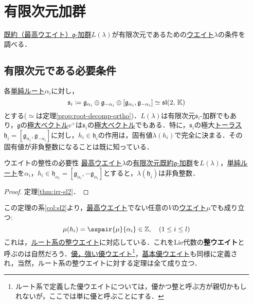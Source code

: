 \documentclass[rep_main]{subfiles}
\begin{document}
\section{有限次元加群}
\hyperref[thm:hwmodule-exist]{既約（最高ウエイト）$\mathfrak{g}$-加群}$L(\lambda)$が有限次元であるための\hyperref[def:weight-rep]{ウエイト}$\lambda$の条件を調べる．
\subsection{有限次元である必要条件}
各\hyperref[def:base-root]{単純ルート}$\alpha_i$に対し，
	\begin{equation}
		\mathfrak{s}_i \coloneqq \mathfrak{g}_{\alpha_i} \oplus \mathfrak{g}_{-\alpha_i} \oplus [\mathfrak{g}_{\alpha_i}, \mathfrak{g}_{-\alpha_i}] \simeq \mathfrak{sl}(2,\, \mathbb{K})
	\end{equation}
	とする($\simeq$は定理\ref{prop:root-decomp-ortho})．$L(\lambda)$は有限次元$\mathfrak{s}_i$-加群でもあり，$\mathfrak{g}$の\hyperref[def:maximal-vector-rep]{極大ベクトル}$v^+$は$\mathfrak{s}_i$の\hyperref[def:maximal-vector-rep]{極大ベクトル}でもある．特に，$\mathfrak{s}_i$の極大\hyperref[def:toral-subLieAlg]{トーラス}$\mathfrak{h}_i = [\mathfrak{g}_{\alpha_i}, \mathfrak{g}_{-\alpha_i}]$に対し，$h_i \in \mathfrak{h}_i$の作用は，固有値$\lambda(h_i)$で完全に決まる．その固有値が非負整数になることは既に知っている．
\begin{mytheo}[label=thm:necessary-for-finite]{ウエイトの整性の必要性}
	\hyperref[def:highest-weight-module]{最高ウエイト}$\lambda$の\hyperref[thm:hwmodule-exist]{有限次元既約$\mathfrak{g}$-加群}を$L(\lambda)$，\hyperref[def:base-root]{単純ルート}を$\alpha_i$，$h_i \in \mathfrak{h}_{\alpha_i} = [\mathfrak{g}_{\alpha_i}, -\mathfrak{g}_{\alpha_i}]$とすると，$\lambda(\mathfrak{h}_i)$は非負整数．
\end{mytheo}
\begin{proof}
	定理\ref{thm:irr-sl2}．
\end{proof}
この定理の系\ref{col:sl2}より，\hyperref[def:highest-weight-module]{最高ウエイト}でない任意の$V$の\hyperref[def:weight-rep]{ウエイト}$\mu$でも成り立つ:
\begin{equation}
	\label{eq:int-weight}
	\mu(h_i) = \sspair{\mu}{\alpha_i} \in \mathbb{Z},\quad  (1 \leq i \leq l)
\end{equation}
これは，\hyperref[def:root-lattice]{ルート系の整ウエイト}に対応している．これをLie代数の\textbf{整ウエイト}と呼ぶのは自然だろう．\hyperref[def:domweight]{優，強い優ウエイト}\footnote{ルート系で定義した優ウエイトについては，優かつ整と呼ぶ方が親切かもしれないが，ここでは単に優と呼ぶことにする．}，\hyperref[def:fundamental-weight]{基本優ウエイト}も同様に定義され，当然，ルート系の整ウエイトに対する定理は全て成り立つ．\\
\end{document}

